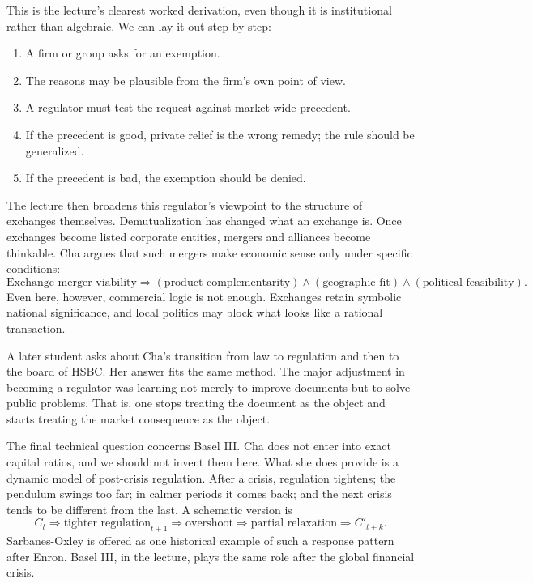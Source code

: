 This is the lecture's clearest worked derivation, even though it is institutional rather than algebraic. We can lay it out step by step:
\begin{enumerate}
\item A firm or group asks for an exemption.
\item The reasons may be plausible from the firm's own point of view.
\item A regulator must test the request against market-wide precedent.
\item If the precedent is good, private relief is the wrong remedy; the rule should be generalized.
\item If the precedent is bad, the exemption should be denied.
\end{enumerate}

The lecture then broadens this regulator's viewpoint to the structure of exchanges themselves. Demutualization has changed what an exchange is. Once exchanges become listed corporate entities, mergers and alliances become thinkable. Cha argues that such mergers make economic sense only under specific conditions:
\begin{equation}
\text{Exchange merger viability}
\Rightarrow
(\text{product complementarity})
\land
(\text{geographic fit})
\land
(\text{political feasibility}).
\end{equation}
Even here, however, commercial logic is not enough. Exchanges retain symbolic national significance, and local politics may block what looks like a rational transaction.

A later student asks about Cha's transition from law to regulation and then to the board of HSBC. Her answer fits the same method. The major adjustment in becoming a regulator was learning not merely to improve documents but to solve public problems. That is, one stops treating the document as the object and starts treating the market consequence as the object.

The final technical question concerns Basel III. Cha does not enter into exact capital ratios, and we should not invent them here. What she does provide is a dynamic model of post-crisis regulation. After a crisis, regulation tightens; the pendulum swings too far; in calmer periods it comes back; and the next crisis tends to be different from the last. A schematic version is
\begin{equation}
C_t
\Rightarrow
\text{tighter regulation}_{t+1}
\Rightarrow
\text{overshoot}
\Rightarrow
\text{partial relaxation}
\Rightarrow
C'_{t+k}.
\end{equation}
Sarbanes-Oxley is offered as one historical example of such a response pattern after Enron. Basel III, in the lecture, plays the same role after the global financial crisis.

